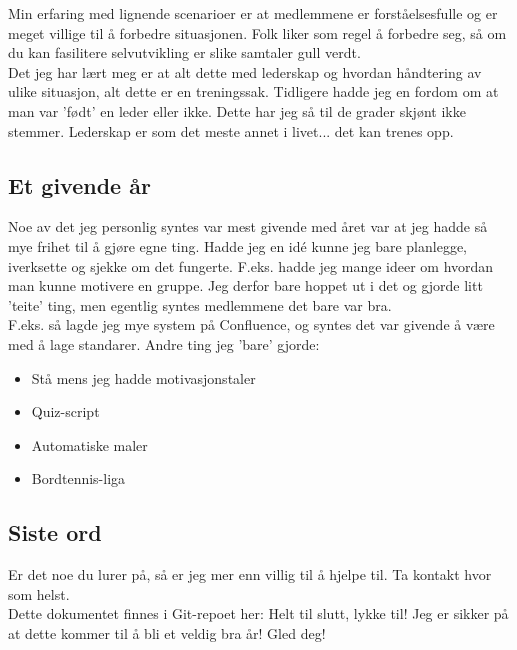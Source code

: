Min erfaring med lignende scenarioer er at medlemmene er forståelsesfulle og er meget villige til å forbedre situasjonen. Folk liker som regel å forbedre seg, så om du kan fasilitere selvutvikling er slike samtaler gull verdt. \\

Det jeg har lært meg er at alt dette med lederskap og hvordan håndtering av ulike situasjon, alt dette er en treningssak. Tidligere hadde jeg en fordom om at man var 'født' en leder eller ikke. Dette har jeg så til de grader skjønt ikke stemmer. Lederskap er som det meste annet i livet... det kan trenes opp. 

\subsection{Et givende år}
Noe av det jeg personlig syntes var mest givende med året var at jeg hadde så mye frihet til å gjøre egne ting. Hadde jeg en idé kunne jeg bare planlegge, iverksette og sjekke om det fungerte. F.eks. hadde jeg mange ideer om hvordan man kunne motivere en gruppe. Jeg derfor bare hoppet ut i det og gjorde litt 'teite' ting, men egentlig syntes medlemmene det bare var bra. \\
	F.eks. så lagde jeg mye system på Confluence, og syntes det var givende å være med å lage standarer.
	Andre ting jeg 'bare' gjorde:
\begin{itemize}
	\item Stå mens jeg hadde motivasjonstaler
	\item Quiz-script
	\item Automatiske maler
	\item Bordtennis-liga
\end{itemize}

\subsection*{Siste ord}
Er det noe du lurer på, så er jeg mer enn villig til å hjelpe til. Ta kontakt hvor som helst. \\
Dette dokumentet finnes i Git-repoet her: 
Helt til slutt, lykke til! Jeg er sikker på at dette kommer til å bli et veldig bra år! Gled deg!\\


% 
% 


